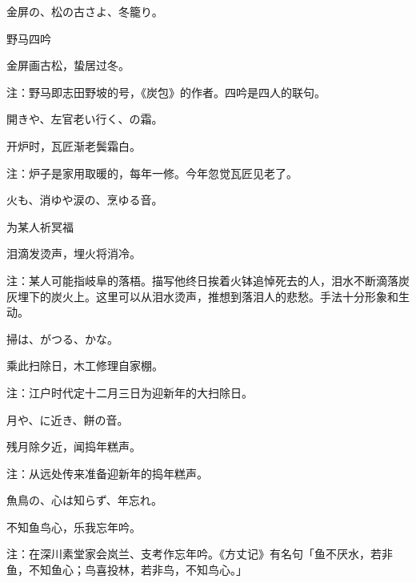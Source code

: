 \begin{haiku}
    {\FH 金屏の、松の古さよ、冬籠り。}

    {\FK 野马四吟}

    {\FK 金屏画古松，蛰居过冬。}

    {\FT 注：野马即志田野坡的号，《炭包》的作者。四吟是四人的联句。}
\end{haiku}

\begin{haiku}
    {\FH {}開きや、左官老い行く、の霜。}

    {\FK 开炉时，瓦匠渐老鬓霜白。}

    {\FT 注：炉子是家用取暖的，每年一修。今年忽觉瓦匠见老了。}
\end{haiku}

\begin{haiku}
    {\FH {}火も、消ゆや涙の、烹ゆる音。}

    {\FK 为某人祈冥福}

    {\FK 泪滴发烫声，埋火将消冷。}

    {\FT 注：某人可能指岐阜的落梧。描写他终日挨着火钵追悼死去的人，泪水不断滴落炭灰埋下的炭火上。这里可以从泪水烫声，推想到落泪人的悲愁。手法十分形象和生动。}
\end{haiku}

\begin{haiku}
    {\FH {}掃は、がつる、かな。}

    {\FK 乘此扫除日，木工修理自家棚。}

    {\FT 注：江户时代定十二月三日为迎新年的大扫除日。}
\end{haiku}

\begin{haiku}
    {\FH 月や、に近き、餅の音。}

    {\FK 残月除夕近，闻捣年糕声。}

    {\FT 注：从远处传来准备迎新年的捣年糕声。}
\end{haiku}

\begin{haiku}
    {\FH 魚鳥の、心は知らず、年忘れ。}

    {\FK 不知鱼鸟心，乐我忘年吟。}

    {\FT 注：在深川素堂家会岚兰、支考作忘年吟。《方丈记》有名句「鱼不厌水，若非鱼，不知鱼心；鸟喜投林，若非鸟，不知鸟心。」}
\end{haiku}

